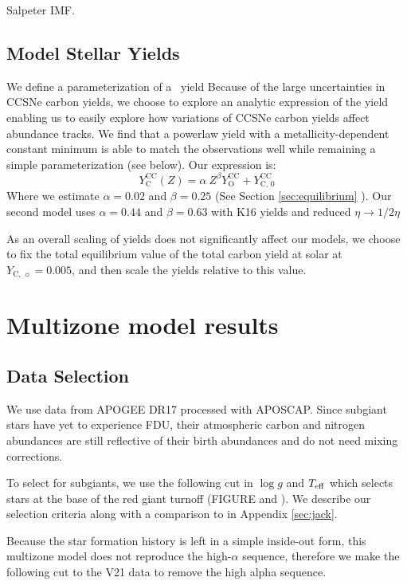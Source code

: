 \documentclass[fleqn,usenatbib]{mnras}
\begin{document}
Salpeter IMF.

\subsection{Model Stellar Yields}
We define a parameterization of a \CC~yield
  Because of the large uncertainties in CCSNe carbon yields, we choose to explore an analytic expression of the yield enabling us to easily explore how variations of CCSNe carbon yields affect abundance tracks. We find that a powerlaw yield with a metallicity-dependent constant minimum is able to match the observations well while remaining a simple parameterization (see below). Our expression is:
  \begin{equation}\label{eq:y_yields}
   Y_\text{C}^\text{CC}(Z) =  \alpha\ Z^\beta Y_\text{O}^\text{CC} + Y_\text{C, 0}^\text{CC}
    \end{equation}
   	Where we estimate $\alpha = 0.02$ and $\beta = 0.25$ (See Section \ref{sec:equilibrium} ). Our second model uses $\alpha = 0.44$ and $\beta = 0.63$ with K16 yields and reduced $\eta \rightarrow 1/2 \eta$ 
    
    As an overall scaling of yields does not significantly affect our models, we choose to fix the total equilibrium value of the total carbon yield at solar at $Y_{\text{C},\ \sun} = 0.005$, and then scale the yields relative to this value. 

\section{Multizone model results}


\subsection{Data Selection}

We use data from APOGEE DR17 \citep{apogee17} processed with APOSCAP. Since subgiant stars have yet to experience FDU, their atmospheric carbon and nitrogen abundances are still reflective of their birth abundances and do not need mixing corrections. 

To select for subgiants, we use the following cut in $\log g$ and $T_{\rm eff}$
which selects stars at the base of the red giant turnoff (FIGURE and
\cite{jack_subgiant}). We describe our selection criteria along with a 
comparison to \citet{fiorenzo+21} in Appendix \ref{sec:jack}. 

Because the star formation history is left in a simple inside-out form, this multizone model does not reproduce the high-$\alpha$ sequence, therefore we make the following cut to the V21 data to remove the high alpha sequence.
\end{document}
